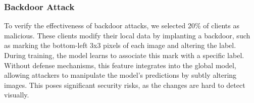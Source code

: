 \documentclass[conference]{IEEEtran}
\begin{document}
\subsubsection{\textbf{Backdoor Attack}}
\label{exp:attack:backdoor}



To verify the effectiveness of backdoor attacks, we selected 20\% of clients as malicious. These clients modify their local data by implanting a backdoor, such as marking the bottom-left 3x3 pixels of each image and altering the label. During training, the model learns to associate this mark with a specific label. Without defense mechanisms, this feature integrates into the global model, allowing attackers to manipulate the model's predictions by subtly altering images. This poses significant security risks, as the changes are hard to detect visually.
\end{document}
